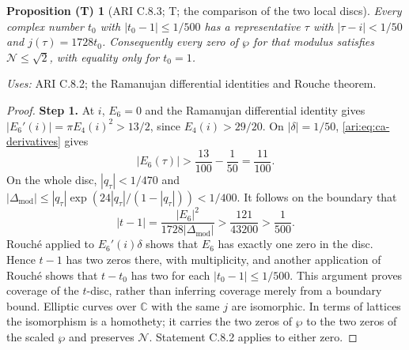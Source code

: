 \documentclass[11pt,a4paper]{article}
\theoremstyle{plain}
\newtheorem{proposition}[theorem]{Proposition (T)}
\theoremstyle{definition}
\newcommand{\C}{\mathbb C}
\begin{document}
\begin{proposition}[ARI C.8.3; T; the comparison of the two local discs]\label{ari:C.8.3}
Every complex number $t_0$ with $|t_0-1|\le1/500$ has a
representative $\tau$ with $|\tau-i|<1/50$ and $j(\tau)=1728t_0$.
Consequently every zero of $\wp$ for that modulus satisfies
$\mathcal N\le\sqrt2$, with equality only for $t_0=1$.
\end{proposition}
\noindent\textit{Uses:} ARI C.8.2; the Ramanujan differential identities and Rouche theorem.\par
\begin{proof}
\noindent\textbf{Step 1.} At $i$, $E_6=0$ and the Ramanujan differential identity gives
$|E_6'(i)|=\pi E_4(i)^2>13/2$, since $E_4(i)>29/20$.
On $|\delta|=1/50$, \eqref{ari:eq:ca-derivatives} gives
\[
 |E_6(\tau)|>\frac{13}{100}-\frac1{50}=\frac{11}{100}.
\]
On the whole disc, $|q_\tau|<1/470$ and
$|\Delta_{\mathrm{mod}}|\le |q_\tau|\exp(24|q_\tau|/(1-|q_\tau|))<1/400$.
It follows on the boundary that
\[
 |t-1|=\frac{|E_6|^2}{1728|\Delta_{\mathrm{mod}}|}
 >\frac{121}{43200}>\frac1{500}.
\]
Rouch\'e applied to $E_6'(i)\delta$ shows that $E_6$ has
exactly one zero in the disc. Hence $t-1$ has two zeros there,
with multiplicity, and another application of Rouch\'e shows
that $t-t_0$ has two for each $|t_0-1|\le1/500$.
This argument proves coverage of the $t$-disc, rather than
inferring coverage merely from a boundary bound. Elliptic
curves over $\C$ with the same $j$ are isomorphic. In terms of
lattices the isomorphism is a homothety; it carries the two
zeros of $\wp$ to the two zeros of the scaled $\wp$ and
preserves $\mathcal N$. Statement C.8.2 applies to either zero.
\end{proof}
\end{document}
